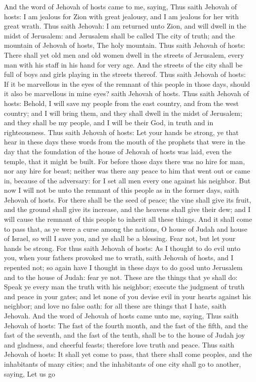 And the word of Jehovah of hosts came to me, saying, Thus saith Jehovah of hosts: I am jealous for Zion with great jealousy, and I am jealous for her with great wrath. Thus saith Jehovah: I am returned unto Zion, and will dwell in the midst of Jerusalem: and Jerusalem shall be called The city of truth; and the mountain of Jehovah of hosts, The holy mountain. Thus saith Jehovah of hosts: There shall yet old men and old women dwell in the streets of Jerusalem, every man with his staff in his hand for very age. And the streets of the city shall be full of boys and girls playing in the streets thereof. Thus saith Jehovah of hosts: If it be marvellous in the eyes of the remnant of this people in those days, should it also be marvellous in mine eyes? saith Jehovah of hosts. Thus saith Jehovah of hosts: Behold, I will save my people from the east country, and from the west country; and I will bring them, and they shall dwell in the midst of Jerusalem; and they shall be my people, and I will be their God, in truth and in righteousness.  Thus saith Jehovah of hosts: Let your hands be strong, ye that hear in these days these words from the mouth of the prophets that were in the day that the foundation of the house of Jehovah of hosts was laid, even the temple, that it might be built. For before those days there was no hire for man, nor any hire for beast; neither was there any peace to him that went out or came in, because of the adversary: for I set all men every one against his neighbor. But now I will not be unto the remnant of this people as in the former days, saith Jehovah of hosts. For there shall be the seed of peace; the vine shall give its fruit, and the ground shall give its increase, and the heavens shall give their dew; and I will cause the remnant of this people to inherit all these things. And it shall come to pass that, as ye were a curse among the nations, O house of Judah and house of Israel, so will I save you, and ye shall be a blessing. Fear not, but let your hands be strong.  For thus saith Jehovah of hosts: As I thought to do evil unto you, when your fathers provoked me to wrath, saith Jehovah of hosts, and I repented not; so again have I thought in these days to do good unto Jerusalem and to the house of Judah: fear ye not. These are the things that ye shall do: Speak ye every man the truth with his neighbor; execute the judgment of truth and peace in your gates; and let none of you devise evil in your hearts against his neighbor; and love no false oath: for all these are things that I hate, saith Jehovah.  And the word of Jehovah of hosts came unto me, saying, Thus saith Jehovah of hosts: The fast of the fourth month, and the fast of the fifth, and the fast of the seventh, and the fast of the tenth, shall be to the house of Judah joy and gladness, and cheerful feasts; therefore love truth and peace. Thus saith Jehovah of hosts: It shall yet come to pass, that there shall come peoples, and the inhabitants of many cities; and the inhabitants of one city shall go to another, saying, Let us go 